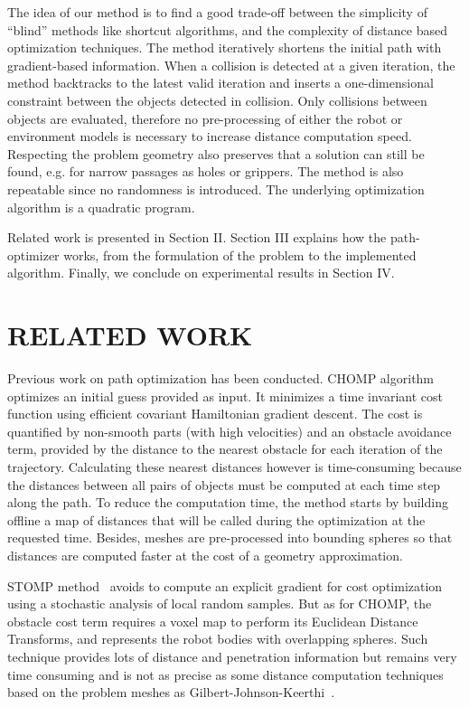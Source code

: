 \documentclass{tADR2e}
\begin{document}
The idea of our method is to find a good trade-off between
the simplicity of “blind” methods like shortcut algorithms,
and the complexity of distance based optimization techniques.
The method iteratively shortens the initial path with gradient-based information.
When a collision is detected at a given iteration, the method backtracks to the
latest valid iteration and inserts a one-dimensional constraint
between the objects detected in collision. Only collisions between objects are 
evaluated, therefore no pre-processing of either the
robot or environment models is necessary to increase distance computation speed. 
Respecting the problem geometry also 
preserves that a solution can still be found, e.g. for narrow passages as holes or 
grippers. The method is also repeatable since no randomness is introduced. The underlying optimization algorithm is a quadratic program.

Related work is presented in Section II. Section III explains how the 
path-optimizer works, from the formulation of the problem to the implemented
algorithm. Finally, we conclude on experimental results in Section IV.

\section{RELATED WORK}
Previous work on path optimization has been conducted. CHOMP algorithm~\cite{chompIjrr} optimizes an initial guess provided as
input. It minimizes a time invariant cost function using efficient covariant
Hamiltonian gradient descent. The cost is quantified by non-smooth parts (with
high velocities) and an obstacle avoidance term, provided by the distance to the 
nearest obstacle for each iteration of the trajectory. Calculating these nearest 
distances however is time-consuming because the distances between all pairs of 
objects must be computed at each time step along the path. To reduce the 
computation time, the method starts by building offline a map of distances that 
will be called during the optimization at the requested time. Besides, meshes 
are pre-processed into bounding spheres so that distances are computed faster 
at the cost of a geometry approximation.

STOMP method~\cite{KalakrishnanStomp} avoids to compute an 
explicit gradient for cost optimization using a stochastic analysis of local 
random samples. But as for CHOMP, the obstacle cost term requires a voxel map to 
perform its Euclidean Distance Transforms, and represents the robot bodies with 
overlapping spheres. Such technique provides lots of distance and penetration 
information but remains very time consuming and is not as precise as some 
distance computation techniques based on the problem meshes as 
Gilbert-Johnson-Keerthi~\cite{gilbertGjk}.
\end{document}
